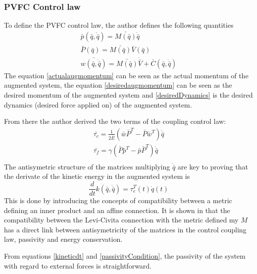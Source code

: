 \subsubsection{PVFC Control law}
To define the PVFC control law, the author defines the following quantities
\begin{align}
    \bar{p}(\bar{q}, \dot{\bar{q}}) = \bar{M(\bar{q})}\dot{\bar{q}} \label{actualaugmomentum}\\
    \bar{P}(\bar{q}) = \bar{M(\bar{q})}\bar{V}(\bar{q}) \label{desiredaugmomentum}\\
    \bar{w(\bar{q}, \dot{\bar{q}})} = \bar{M(\bar{q})}\dot{\bar{V}} + \bar{C}(\bar{q}, \dot{\bar{q}}) \label{desiredDynamics}
\end{align}
The equation \ref{actualaugmomentum} can be seen as the actual momentum of the augmented system, the equation \ref{desiredaugmomentum} can be seen 
as the desired momentum of the augmented system and \ref{desiredDynamics} is the desired dynamics (desired force applied on) of the augmented system.


From there the author derived the two terms of the coupling control law: 
\begin{align}
    \bar{\tau_c} = \frac{1}{2\bar{E}}(\bar{w}\bar{P}^T - \bar{P}\bar{w}^T ) \dot{\bar{q}} \label{tauc}\\
    \bar{\tau_f} = \gamma(\bar{P}\bar{p}^T - \bar{p}\bar{P}^T ) \dot{\bar{q}} \label{tauf}\\
\end{align}
The antisymetric structure of the matrices multiplying $\dot{\bar{q}}$ are key to proving that the derivate of the kinetic energy in the augmented system is 
\begin{equation}
    \frac{d}{dt}k(\bar{q}, \dot{\bar{q}}) = \tau_e^T(t)\dot{q}(t) \label{kineticdt}
\end{equation}
This is done by introducing the concepts of compatibility between a metric defining an inner product and an affine connection. It is shown in \cite{li2001passive} that the compatibility between the Levi-Civita connection with the metric defined my $M$ has a direct link between antisymetricity of the matrices in the control coupling law, passivity and energy conservation.

From equations \ref{kineticdt} and \ref{passivityCondition}, the passivity of the system with regard to external forces is straightforward.
